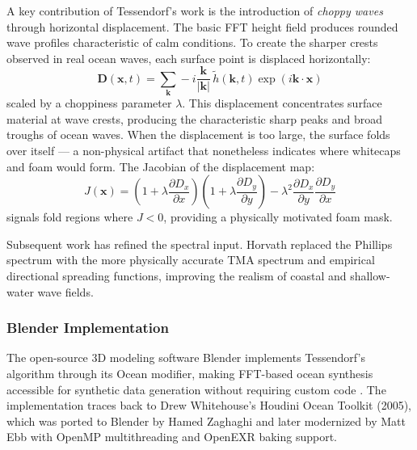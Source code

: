     A key contribution of Tessendorf's work is the introduction of \emph{choppy waves} through horizontal displacement. The basic FFT height field produces rounded wave profiles characteristic of calm conditions. To create the sharper crests observed in real ocean waves, each surface point is displaced horizontally:
    \begin{equation}
        \mathbf{D}(\mathbf{x}, t) = \sum_{\mathbf{k}} -i\frac{\mathbf{k}}{|\mathbf{k}|}\, \tilde{h}(\mathbf{k}, t) \exp(i\mathbf{k} \cdot \mathbf{x})
        \label{eq:displacement}
    \end{equation}
    scaled by a choppiness parameter $\lambda$. This displacement concentrates surface material at wave crests, producing the characteristic sharp peaks and broad troughs of ocean waves. When the displacement is too large, the surface folds over itself --- a non-physical artifact that nonetheless indicates where whitecaps and foam would form. The Jacobian of the displacement map:
    \begin{equation}
        J(\mathbf{x}) = \left(1 + \lambda \frac{\partial D_x}{\partial x}\right)\left(1 + \lambda \frac{\partial D_y}{\partial y}\right) - \lambda^2 \frac{\partial D_x}{\partial y}\frac{\partial D_y}{\partial x}
        \label{eq:jacobian}
    \end{equation}
    signals fold regions where $J < 0$, providing a physically motivated foam mask.

    Subsequent work has refined the spectral input. Horvath \cite{Horvath2015} replaced the Phillips spectrum with the more physically accurate TMA spectrum and empirical directional spreading functions, improving the realism of coastal and shallow-water wave fields.

    \subsubsection{Blender Implementation}

    The open-source 3D modeling software Blender implements Tessendorf's algorithm through its Ocean modifier, making FFT-based ocean synthesis accessible for synthetic data generation without requiring custom code \cite{BlenderOceanModifier}. The implementation traces back to Drew Whitehouse's Houdini Ocean Toolkit (2005), which was ported to Blender by Hamed Zaghaghi and later modernized by Matt Ebb with OpenMP multithreading and OpenEXR baking support.

